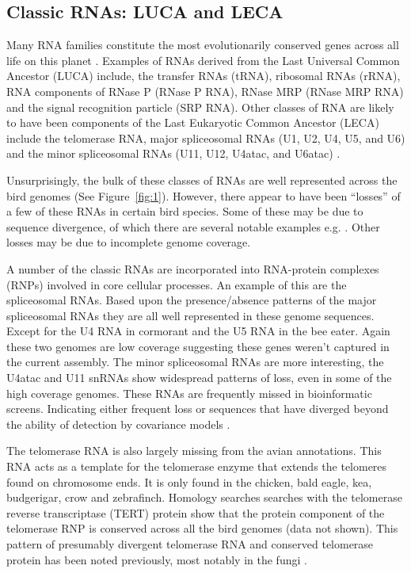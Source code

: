 \documentclass[10pt]{bmc_article}
\newenvironment{bmcformat}{\begin{raggedright}\baselineskip20pt\sloppy\setboolean{publ}{false}}{\end{raggedright}\baselineskip20pt\sloppy}
\begin{document}
\begin{bmcformat}
\subsection*{Classic RNAs: LUCA and LECA}

Many RNA families constitute the most evolutionarily conserved genes
across all life on this planet \cite{Jeffares:1998}. Examples of RNAs
derived from the Last Universal Common Ancestor (LUCA) include, the
transfer RNAs (tRNA), ribosomal RNAs (rRNA), RNA components of RNase P
(RNase P RNA), RNase MRP (RNase MRP RNA) and the signal recognition
particle (SRP RNA). Other classes of RNA are likely to have been
components of the Last Eukaryotic Common Ancestor (LECA) include the
telomerase RNA, major spliceosomal RNAs (U1, U2, U4, U5, and U6) and
the minor spliceosomal RNAs (U11, U12, U4atac, and U6atac)
\cite{Hoeppner:2012}.

Unsurprisingly, the bulk of these classes of RNAs are well represented
across the bird genomes (See Figure~\ref{fig:1}). However, there
appear to have been ``losses'' of a few of these RNAs in certain bird
species. Some of these may be due to sequence divergence, of which
there are several notable examples e.g.
\cite{Leonardi:2008,Webb:2008,Mao:,Lai:2010,Chan:2011}. Other losses
may be due to incomplete genome coverage.

A number of the classic RNAs are incorporated into RNA-protein
complexes (RNPs) involved in core cellular processes. An example of
this are the spliceosomal RNAs. Based upon the presence/absence
patterns of the major spliceosomal RNAs they are all well represented
in these genome sequences. Except for the U4 RNA in cormorant and the
U5 RNA in the bee eater. Again these two genomes are low coverage
suggesting these genes weren't captured in the current assembly. The
minor spliceosomal RNAs are more interesting, the U4atac and U11
snRNAs show widespread patterns of loss, even in some of the high
coverage genomes. These RNAs are frequently missed in bioinformatic
screens. Indicating either frequent loss \cite{Davila_Lopez:2008} or
sequences that have diverged beyond the ability of detection by
covariance models \cite{Marz:2008}.

The telomerase RNA is also largely missing from the avian
annotations. This RNA acts as a template for the telomerase enzyme
that extends the telomeres found on chromosome ends. It is only found
in the chicken, bald eagle, kea, budgerigar, crow and
zebrafinch. Homology searches searches with the telomerase reverse
transcriptase (TERT) protein show that the protein component of the
telomerase RNP is conserved across all the bird genomes (data not
shown). This pattern of presumably divergent telomerase RNA and
conserved telomerase protein has been noted previously, most notably
in the fungi \cite{Leonardi:2008,Webb:2008}.


\end{bmcformat}
\end{document}
